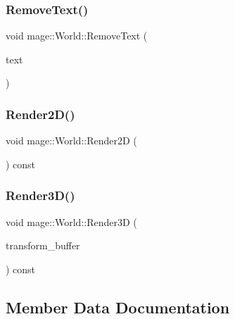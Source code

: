 \hypertarget{classmage_1_1_world_a5ae17dc1e2f8cc668a1a519430d409af}{}\label{classmage_1_1_world_a5ae17dc1e2f8cc668a1a519430d409af} 
\subsubsection{\texorpdfstring{Remove\+Text()}{RemoveText()}}
{\footnotesize\ttfamily void mage\+::\+World\+::\+Remove\+Text (\begin{DoxyParamCaption}\item[{\hyperlink{namespacemage_a1e01ae66713838a7a67d30e44c67703e}{Shared\+Ptr}$<$ \hyperlink{classmage_1_1_sprite_text}{Sprite\+Text} $>$}]{text }\end{DoxyParamCaption})}

\hypertarget{classmage_1_1_world_a49e7adf01a415aefc911d69c6fcee665}{}\label{classmage_1_1_world_a49e7adf01a415aefc911d69c6fcee665} 
\subsubsection{\texorpdfstring{Render2\+D()}{Render2D()}}
{\footnotesize\ttfamily void mage\+::\+World\+::\+Render2D (\begin{DoxyParamCaption}{ }\end{DoxyParamCaption}) const}

\hypertarget{classmage_1_1_world_a6d5a6fe97bf24c174d9c8f544be34d13}{}\label{classmage_1_1_world_a6d5a6fe97bf24c174d9c8f544be34d13} 
\subsubsection{\texorpdfstring{Render3\+D()}{Render3D()}}
{\footnotesize\ttfamily void mage\+::\+World\+::\+Render3D (\begin{DoxyParamCaption}\item[{const Transform\+Buffer \&}]{transform\+\_\+buffer }\end{DoxyParamCaption}) const}



\subsection{Member Data Documentation}
\hypertarget{classmage_1_1_world_a8c0f2183e71d368824bab701713c5792}{}\label{classmage_1_1_world_a8c0f2183e71d368824bab701713c5792} 

